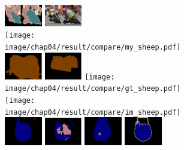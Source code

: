 \begin{figure}[h!]
\begin{subfigure}{0.55\textwidth}
		\includegraphics[width=0.18\textwidth]{image/chap04/result/compare/2007_005173.png}
		\includegraphics[width=0.18\textwidth]{image/chap04/result/compare/2007_005173.jpg}
		\\
		\texttt{[image: image/chap04/result/compare/my\_sheep.pdf]}
		\includegraphics[width=0.18\textwidth]{image/chap04/result/compare/fcn_sheep.png}
		\includegraphics[width=0.18\textwidth]{image/chap04/result/compare/sds_sheep.png}
		\texttt{[image: image/chap04/result/compare/gt\_sheep.pdf]}
		\texttt{[image: image/chap04/result/compare/im\_sheep.pdf]}
		\\
		\includegraphics[width=0.18\textwidth]{image/chap04/result/compare/my_boat.png}
		\includegraphics[width=0.18\textwidth]{image/chap04/result/compare/fcn_boat.png}
		\includegraphics[width=0.18\textwidth]{image/chap04/result/compare/sds_boat.png}
		\includegraphics[width=0.18\textwidth]{image/chap04/result/compare/2007_004241.png}

\end{subfigure}
\end{figure}
